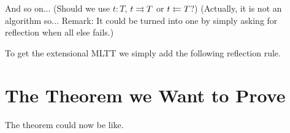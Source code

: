 \documentclass{amsart}
\begin{document}
\begin{mathc}
\end{mathc}

\begin{mathc}
\end{mathc}
%
And so on... (Should we use $t : T$, $t \rightrightarrows T$ or $t \leftleftarrows T$?)
(Actually, it is not an algorithm so... Remark: It could be turned into one
by simply asking for reflection when all else fails.)

To get the extensional MLTT we simply add the following reflection rule.
%
\begin{mathc}
\end{mathc}


\section{The Theorem we Want to Prove}

The theorem could now be like.
\end{document}
